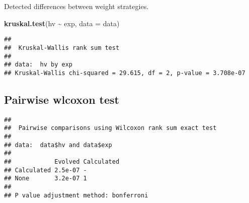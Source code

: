 \documentclass[
]{book}
\newenvironment{Shaded}{\begin{snugshade}}{\end{snugshade}}
\newcommand{\AttributeTok}[1]{\textcolor[rgb]{0.13,0.29,0.53}{#1}}
\newcommand{\ConstantTok}[1]{\textcolor[rgb]{0.56,0.35,0.01}{#1}}
\newcommand{\FunctionTok}[1]{\textcolor[rgb]{0.13,0.29,0.53}{\textbf{#1}}}
\newcommand{\NormalTok}[1]{#1}
\newcommand{\SpecialCharTok}[1]{\textcolor[rgb]{0.81,0.36,0.00}{\textbf{#1}}}
\newcommand{\StringTok}[1]{\textcolor[rgb]{0.31,0.60,0.02}{#1}}
\begin{document}
Detected differences between weight strategies.

\begin{Shaded}
\begin{Highlighting}[]
\FunctionTok{kruskal.test}\NormalTok{(hv }\SpecialCharTok{\textasciitilde{}}\NormalTok{ exp, }\AttributeTok{data =}\NormalTok{ data)}
\end{Highlighting}
\end{Shaded}

\begin{verbatim}
## 
##  Kruskal-Wallis rank sum test
## 
## data:  hv by exp
## Kruskal-Wallis chi-squared = 29.615, df = 2, p-value = 3.708e-07
\end{verbatim}

\hypertarget{pairwise-wlcoxon-test-11}{%
\subsection{Pairwise wlcoxon test}\label{pairwise-wlcoxon-test-11}}

\begin{Shaded}
\end{Shaded}

\begin{verbatim}
## 
##  Pairwise comparisons using Wilcoxon rank sum exact test 
## 
## data:  data$hv and data$exp 
## 
##            Evolved Calculated
## Calculated 2.5e-07 -         
## None       3.2e-07 1         
## 
## P value adjustment method: bonferroni
\end{verbatim}

  
\end{document}
